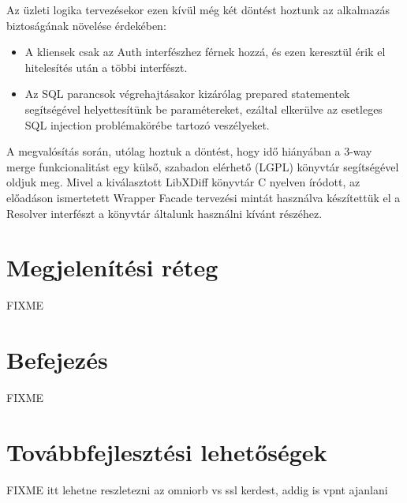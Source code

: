 \documentclass[a4paper,12pt]{article}
\begin{document}
Az üzleti logika tervezésekor ezen kívül még két döntést hoztunk az alkalmazás
biztoságának növelése érdekében:

\begin{itemize}
\item A kliensek csak az Auth interfészhez férnek hozzá, és ezen keresztül érik
el hitelesítés után a többi interfészt.
\item Az SQL parancsok végrehajtásakor kizárólag prepared statementek
segítségével helyettesítünk be paramétereket, ezáltal elkerülve az esetleges
SQL injection problémakörébe tartozó veszélyeket.
\end{itemize}

A megvalósítás során, utólag hoztuk a döntést, hogy idő hiányában a 3-way merge
funkcionalitást egy külső, szabadon elérhető (LGPL) könyvtár segítségével
oldjuk meg. Mivel a kiválasztott LibXDiff könyvtár C nyelven íródott, az
előadáson ismertetett Wrapper Facade tervezési mintát használva készítettük el
a Resolver interfészt a könyvtár általunk használni kívánt részéhez.

\section{Megjelenítési réteg}

FIXME

\section{Befejezés}

FIXME

\section{Továbbfejlesztési lehetőségek}

FIXME itt lehetne reszletezni az omniorb vs ssl kerdest, addig is vpnt ajanlani
\end{document}
